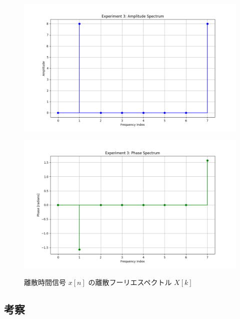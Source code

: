 \documentclass[fleqn, a4paper. 12pt]{jsarticle}
\begin{document}
  \begin{figure}[h]
    \begin{center}
    \begin{minipage}[t]{0.48\columnwidth}
        \includegraphics[width=\columnwidth]{amplitude_spectrum_experiment_3.png}
        \label{fign:a3}
    \end{minipage}
    \begin{minipage}[t]{0.48\columnwidth}
        \includegraphics[width=\columnwidth]{phase_spectrum_experiment_3.png}
        \label{fign:p3}
    \end{minipage}
    \end{center}
    \caption{離散時間信号 $x[n]$ の離散フーリエスペクトル $X[k]$}
  \end{figure}

  \subsection*{考察}
\end{document}
